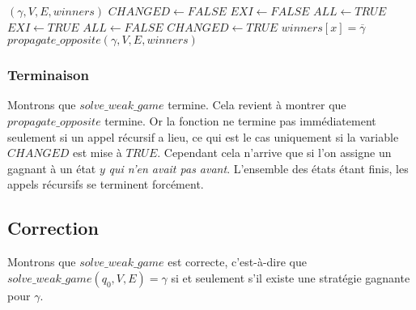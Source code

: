 \documentclass[10pt,a4paper]{article}
\begin{document}
\begin{algorithm}
\caption{$propagate\_opposite$}

\begin{algorithmic}[1]
	\REQUIRE $(\gamma, V, E, winners)$
	\STATE $CHANGED \leftarrow FALSE$
			\STATE $EXI \leftarrow FALSE$
			\STATE $ALL \leftarrow TRUE$
					\STATE $EXI \leftarrow TRUE$
				\ELSE
					\STATE $ALL \leftarrow FALSE$
				\ENDIF
			\ENDFOR
				\STATE $CHANGED \leftarrow TRUE$
				\STATE $winners[x] = \overline{\gamma}$
			\ENDIF
		\ENDIF
	\ENDFOR
		\STATE $propagate\_opposite(\gamma, V, E, winners)$
	\ENDIF
	\RETURN
\end{algorithmic}
\end{algorithm}

\subsubsection{Terminaison}
Montrons que $solve\_weak\_game$ termine. Cela revient à montrer que $propagate\_opposite$ termine. Or la fonction ne termine pas immédiatement seulement si un appel récursif a lieu, ce qui est le cas uniquement si la variable $CHANGED$ est mise à $TRUE$. Cependant cela n'arrive que si l'on assigne un gagnant à un état $y$ \emph{qui n'en avait pas avant}. L'ensemble des états étant finis, les appels récursifs se terminent forcément.

\subsection{Correction}
Montrons que $solve\_weak\_game$ est correcte, c'est-à-dire que $solve\_weak\_game(q_0,V,E) = \gamma$ si et seulement s'il existe une stratégie gagnante pour $\gamma$.
\end{document}
